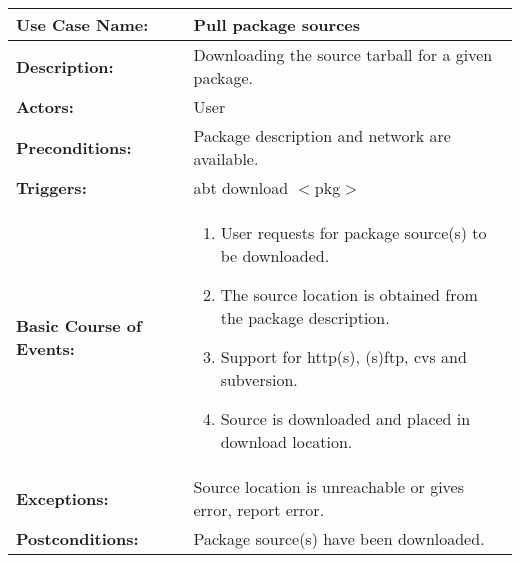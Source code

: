 
\begin{tabularx}{\linewidth}{|l|X|}
\hline
\textbf{Use Case Name:} & \textbf{Pull package sources} \\
\hline
\textbf{Description:} & 
Downloading the source tarball for a given package. \\
\hline
\textbf{Actors:} & User \\
\hline
\textbf{Preconditions:} & 
Package description and network are available. \\
\hline
\textbf{Triggers:} & abt download $<$pkg$>$  \\
\hline
\textbf{Basic Course of Events:} & 
\begin{minipage}{\linewidth} 
  \vspace{0.05em}
  \begin{enumerate}
    \item User requests for package source(s) to be downloaded.
    \item The source location is obtained from the package description.
    \item Support for http(s), (s)ftp, cvs and subversion.
    \item Source is downloaded and placed in download location.
  \end{enumerate}
  \vspace{0.05em}
\end{minipage}
\\
\hline
\textbf{Exceptions:} & 
Source location is unreachable or gives error, report error. \\
\hline 
\textbf{Postconditions:} &
Package source(s) have been downloaded.
\\
\hline
\end{tabularx}



